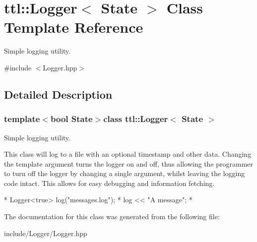 \hypertarget{classttl_1_1_logger}{\section{ttl\-:\-:Logger$<$ State $>$ Class Template Reference}
\label{classttl_1_1_logger}
}


Simple logging utility.  




{\ttfamily \#include $<$Logger.\-hpp$>$}



\subsection{Detailed Description}
\subsubsection*{template$<$bool State$>$class ttl\-::\-Logger$<$ State $>$}

Simple logging utility. 

This class will log to a file with an optional timestamp and other data. Changing the template argument turns the logger on and off, thus allowing the programmer to turn off the logger by changing a single argument, whilst leaving the logging code intact. This allows for easy debugging and information fetching.


\begin{DoxyCode}
*  Logger<true> log(\textcolor{stringliteral}{"messages.log"});
*  log << \textcolor{stringliteral}{"A message"};
*  
\end{DoxyCode}
 

The documentation for this class was generated from the following file\-:\begin{DoxyCompactItemize}
\item 
include/\-Logger/Logger.\-hpp\end{DoxyCompactItemize}
